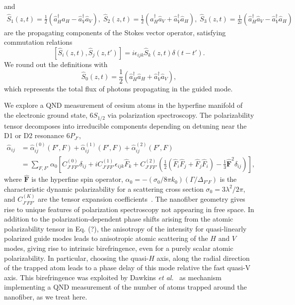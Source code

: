 \documentclass[preprint,aps,pra,onecolumn]{revtex4-1} %
\begin{document}
and 
\begin{align}
\hat{S}_1(z,t) = \frac{1}{2}\left(\hat{a}^\dag_H \hat{a}_H-\hat{a}^\dag_V \hat{a}_V \right), \; \hat{S}_2(z,t) = \frac{1}{2}\left(\hat{a}^\dag_H \hat{a}_V+\hat{a}^\dag_V \hat{a}_H \right), \; \hat{S}_3(z,t) = \frac{1}{2i}\left(\hat{a}^\dag_H \hat{a}_V-\hat{a}^\dag_V \hat{a}_H \right) 
\end{align}
are the propagating components of the Stokes vector operator, satisfying commutation relations
\begin{equation}
\left[\hat{S}_i(z,t), \hat{S}_j(z,t')\right] =i \epsilon_{ijk} \hat{S}_k(z,t) \delta(t-t').
\end{equation}
We round out the definitions with 
\begin{equation}
\hat{S}_0(z,t) = \frac{1}{2}\left(\hat{a}^\dag_H \hat{a}_H+\hat{a}^\dag_V \hat{a}_V \right), 
\end{equation}
which represents the total flux of photons propagating in the guided mode.

 
We explore a QND measurement of cesium atoms in the hyperfine manifold of the electronic ground state, $6S_{1/2}$ via polarization spectroscopy.  The polarizability tensor decomposes into irreducible components depending on detuning near the D1 or D2 resonance $6P_{J'}$,
\begin{align}
\hat{\alpha}_{ij} &= \hat{\alpha}_{ij}^{(0)}(F',F)+\hat{\alpha}_{ij}^{(1)}(F',F)+\hat{\alpha}_{ij}^{(2)}(F',F)\\
&=\sum_{F,F'} \alpha_0 \left[ C_{J'FF'}^{(0)} \delta_{ij}+ iC_{J'FF'}^{(1)}\epsilon_{ijk}\hat{F}_k+ C_{J'FF'}^{(2)}\left(\frac{1}{2} ( \hat{F}_i\hat{F}_j +\hat{F}_j\hat{F}_i )-\frac{1}{3}\hat{\mathbf{F}}^2 \delta_{ij} \right) \right],
\end{align}
where $\hat{\mathbf{F}}$ is the hyperfine spin operator, $\alpha_0 = -(\sigma_0/8\pi k_0) (\Gamma/\Delta_{F'F})$ is the characteristic dynamic polarizability for a scattering cross section $\sigma_0 = 3 \lambda^2/2\pi$, and $C_{J'FF'}^{(K)}$ are the tensor expansion coefficients~\cite{?}.  The nanofiber geometry gives rise to unique features of polarization spectroscopy not appearing in free space.  In addition to the polarization-dependent phase shifts arising from the atomic polarizability tensor in Eq. (?), the anisotropy of the  intensity for quasi-linearly polarized guide modes  leads to anisotropic atomic scattering of the $H$ and $V$ modes, giving rise to intrinsic birefringence, even for a purely scalar atomic polarizability.  In particular, choosing the quasi-$H$ axis, along the radial direction of the trapped atom leads to a phase delay of this mode relative the fast quasi-V axis.  This birefringence was exploited by Dawkins {\em et al.}~\cite{?} as mechanism implementing a QND measurement of the number of atoms trapped around the nanofiber, as we treat here.
\end{document}
